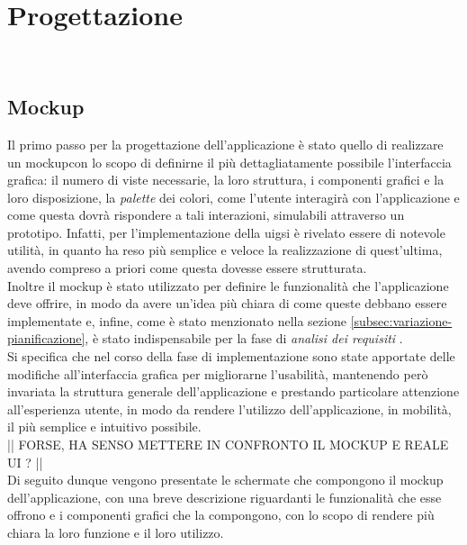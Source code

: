 \chapter{Progettazione}
\label{cap:progettazione}

\\

\section{Mockup}
\label{sec:mockup}

Il primo passo per la progettazione dell'applicazione è stato quello di realizzare un \gls{mockup}\glsoccur con lo scopo di definirne il più dettagliatamente possibile l'interfaccia grafica: il numero di viste necessarie, la loro struttura, i componenti grafici e la loro disposizione, la \emph{palette} dei colori, come l'utente interagirà con l'applicazione e come questa dovrà rispondere a tali interazioni, simulabili attraverso un prototipo. Infatti, per l'implementazione della \gls{uig}\glsoccur si è rivelato essere di notevole utilità, in quanto ha reso più semplice e veloce la realizzazione di quest'ultima, avendo compreso a priori come questa dovesse essere strutturata.\\
Inoltre il \gls{mockup} è stato utilizzato per definire le funzionalità che l'applicazione deve offrire, in modo da avere un'idea più chiara di come queste debbano essere implementate e, infine, come è stato menzionato nella sezione \ref{subsec:variazione-pianificazione}, è stato indispensabile per la fase di \emph{analisi dei requisiti} .\\ 
Si specifica che nel corso della fase di implementazione sono state apportate delle modifiche all'interfaccia grafica per migliorarne l'usabilità, mantenendo però invariata la struttura generale dell'applicazione e prestando particolare attenzione all'esperienza utente, in modo da rendere l'utilizzo dell'applicazione, in mobilità, il più semplice e intuitivo possibile.\\
|| FORSE, HA SENSO METTERE IN CONFRONTO IL MOCKUP E REALE UI ? ||\\
Di seguito dunque vengono presentate le schermate che compongono il mockup dell'applicazione, con una breve descrizione riguardanti le funzionalità che esse offrono e i componenti grafici che la compongono, con lo scopo di rendere più chiara la loro funzione e il loro utilizzo. 

